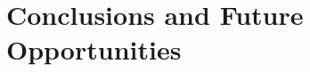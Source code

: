 \documentclass[aps,prb,twocolumn,superscriptaddress]{revtex4-1}
\begin{document}


\section{Conclusions and Future Opportunities}









\end{document}

